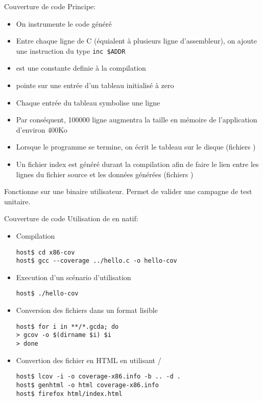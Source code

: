 \begin{frame}[fragile=singleslide]{Couverture de code}
  Principe:
  \begin{itemize}
  \item On instrumente le code généré
  \item Entre chaque ligne de C (équialent à plusieurs ligne
    d'assembleur), on ajoute une instruction du type \verb/inc $ADDR/
  \item {} est une constante definie à la compilation
  \item {} pointe sur une entrée d'un tableau initialisé à zero
  \item Chaque entrée du tableau symbolise une ligne
  \item Par conséquent, 100000 ligne augmentra la taille en mémoire de
    l'application d'environ 400Ko
  \item Lorsque le programme se termine, on écrit le tableau sur le
    disque (fichiers )
  \item Un fichier index est généré durant la compilation afin de faire
    le lien entre les lignes du fichier source et les données générées
    (fichiers )
  \end{itemize}
  Fonctionne sur une binaire utilisateur.
  Permet de valider une campagne de test unitaire.
\end{frame}

\begin{frame}[fragile=singleslide]{Couverture de code}
  Utilisation de  en natif:
  \begin{itemize}
  \item Compilation
    \begin{lstlisting}
host$ cd x86-cov
host$ gcc --coverage ../hello.c -o hello-cov
    \end{lstlisting}
  \item Execution d'un scénario d'utilisation
    \begin{lstlisting}
host$ ./hello-cov
    \end{lstlisting}
  \item Conversion des fichiers   dans un format lisible
    \begin{lstlisting}
host$ for i in **/*.gcda; do
> gcov -o $(dirname $i) $i
> done
    \end{lstlisting}
  \item  Convertion  des  fichier   en  HTML  en  utilisant
    /
    \begin{lstlisting}
host$ lcov -i -o coverage-x86.info -b .. -d .
host$ genhtml -o html coverage-x86.info
host$ firefox html/index.html
    \end{lstlisting}
  \end{itemize}
\end{frame}


